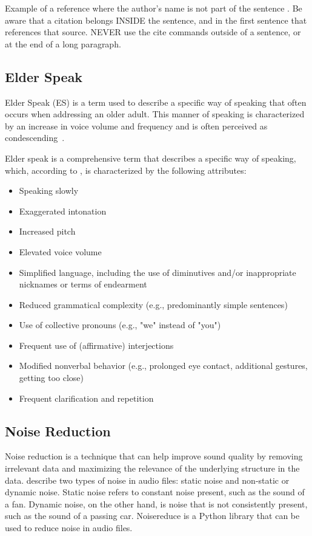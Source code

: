 \documentclass[english]{hogent-article}
\begin{document}
Example of a reference where the author's name is not part of the sentence \autocite{Moore2002}. Be aware that a citation belongs INSIDE the sentence, and in the first sentence that references that source. NEVER use the cite commands outside of a sentence, or at the end of a long paragraph.

\subsection{Elder Speak}
Elder Speak (ES) is a term used to describe a specific way of speaking that often occurs when addressing an older adult. This manner of speaking is characterized by an increase in voice volume and frequency and is often perceived as condescending~\autocite{SteveBalsis2006}.

Elder speak is a comprehensive term that describes a specific way of speaking, which, according to \cite{Campens2021}, is characterized by the following attributes:

\begin{itemize}
    \item Speaking slowly
    \item Exaggerated intonation
    \item Increased pitch
    \item Elevated voice volume
    \item Simplified language, including the use of diminutives and/or inappropriate nicknames or terms of endearment
    \item Reduced grammatical complexity (e.g., predominantly simple sentences)
    \item Use of collective pronouns (e.g., "we" instead of "you")
    \item Frequent use of (affirmative) interjections
    \item Modified nonverbal behavior (e.g., prolonged eye contact, additional gestures, getting too close)
    \item Frequent clarification and repetition
\end{itemize}

\subsection{Noise Reduction}
Noise reduction is a technique that can help improve sound quality by removing irrelevant data and maximizing the relevance of the underlying structure in the data.
\cite{Sainburg_2021} describe two types of noise in audio files: static noise and non-static or dynamic noise.
Static noise refers to constant noise present, such as the sound of a fan.
Dynamic noise, on the other hand, is noise that is not consistently present, such as the sound of a passing car.
Noisereduce \autocite{Sainburg2022} is a Python library that can be used to reduce noise in audio files.
\end{document}
